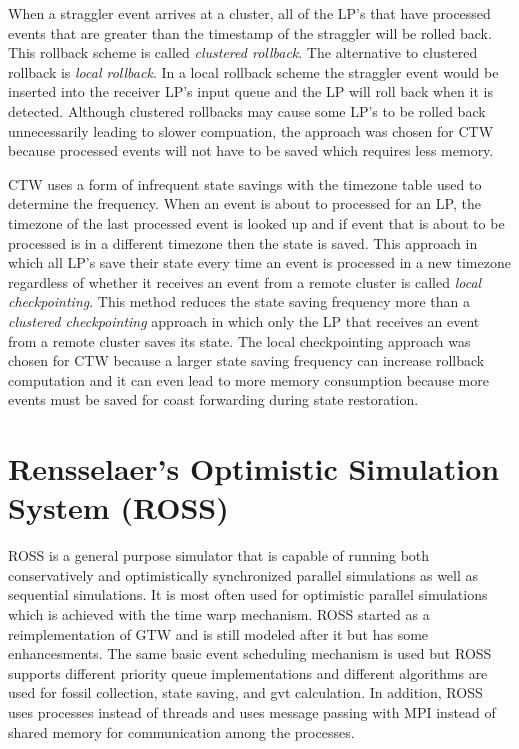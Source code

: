 \documentclass[11pt]{book}
\begin{document}
When a straggler event arrives at a cluster, all of the LP's that have processed events that
are greater than the timestamp of the straggler will be rolled back. This rollback scheme is
called \emph{clustered rollback}. The alternative to clustered rollback is \emph{local
rollback}. In a local rollback scheme the straggler event would be inserted into the receiver
LP's input queue and the LP will roll back when it is detected. Although clustered rollbacks
may cause some LP's to be rolled back unnecessarily leading to slower compuation, the
approach was chosen for CTW because processed events will not have to be saved which
requires less memory.

CTW uses a form of infrequent state savings with the timezone table used to determine the
frequency. When an event is about to processed for an LP, the timezone of the last processed
event is looked up and if event that is about to be processed is in a different timezone then
the state is saved. This approach in which all LP's save their state every time an event is
processed in a new timezone regardless of whether it receives an event from a remote cluster
is called \emph{local checkpointing}. This method reduces the state saving frequency more
than a \emph{clustered checkpointing} approach in which only the LP that receives an event
from a remote cluster saves its state. The local checkpointing approach was chosen for CTW
because a larger state saving frequency can increase rollback computation and it can even
lead to more memory consumption because more events must be saved for coast forwarding
during state restoration.

\section{Rensselaer's Optimistic Simulation System (ROSS)}

ROSS\cite{carothers-00} is a general purpose simulator that is capable of running both
conservatively and optimistically synchronized parallel simulations as well as sequential
simulations. It is most often used for optimistic parallel simulations which is achieved
with the time warp mechanism. ROSS started as a reimplementation of GTW and is still
modeled after it but has some enhancesments. The same basic event scheduling mechanism is
used but ROSS supports different priority queue implementations and different algorithms
are used for fossil collection, state saving, and gvt calculation. In addition, ROSS uses
processes instead of threads and uses message passing with MPI instead of shared memory
for communication among the processes.
\end{document}

